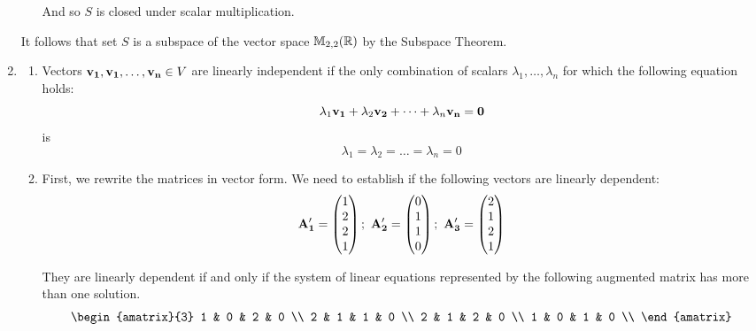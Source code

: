 \begin{enumerate}
\begin{itemize}
                And so $S$ is closed under scalar multiplication.
        \end{itemize}

        It follows that set $S$ is a subspace of the vector
        space $\mathbb{M}_{2,2}(\mathbb{R})$ by the Subspace Theorem.

    \item
        \begin{enumerate}
            \item
                Vectors $\mathbf{v_1}, \mathbf{v_1}, \dots, \mathbf{v_n} \in V$ are
                linearly independent if the only combination of scalars
                $\lambda_1, \dots, \lambda_n$ for which the following
                equation holds:
                $$\lambda_1\mathbf{v_1} + \lambda_2\mathbf{v_2} + \dots + \lambda_n\mathbf{v_n} = \mathbf{0}$$
                is
                $$\lambda_1 = \lambda_2 = \dots = \lambda_n = 0$$
            \item
                First, we rewrite the matrices in vector form. We need
                to establish if the following vectors are linearly
                dependent:
                $$
                \mathbf{A'_1} = \begin{pmatrix}1 \\ 2 \\ 2 \\ 1\end{pmatrix};~
                \mathbf{A'_2} = \begin{pmatrix}0 \\ 1 \\ 1 \\ 0\end{pmatrix};~
                \mathbf{A'_3} = \begin{pmatrix}2 \\ 1 \\ 2 \\ 1\end{pmatrix}
                $$

                They are linearly dependent if and only if the system of
                linear equations represented by the following augmented
                matrix has more than one solution.
                $$
                    \begin{amatrix}{3}
                        1 & 0 & 2 & 0 \\
                        2 & 1 & 1 & 0 \\
                        2 & 1 & 2 & 0 \\
                        1 & 0 & 1 & 0 \\
                    \end{amatrix}
                $$


\end{enumerate}
\end{enumerate}
